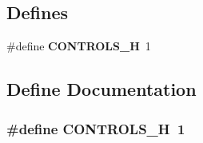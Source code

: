 \subsection*{Defines}
\begin{CompactItemize}
\item 
\#define {\bf CONTROLS\_\-H}~1
\end{CompactItemize}


\subsection{Define Documentation}
\subsubsection{\setlength{\rightskip}{0pt plus 5cm}\#define CONTROLS\_\-H~1}\label{controls_8h_dbcef44a41ba27e50a21d80a826bcf1e}


